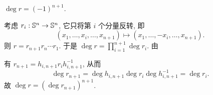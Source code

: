 \begin{Proposition}
	$ \deg r=(-1)^{n+1} $.
\end{Proposition}
\begin{Proof}
	考虑 $ r_i : \S^n\to\S^n $, 它只将第 $ i $ 个分量反转, 即
	\[
		(x_1,\dots,x_i,\dots,x_{n+1})\mapsto (x_1,\dots,-x_i,\dots,x_{n+1}).
	\]
	则 $ r=r_{n+1}r_n\cdots r_1 $. 于是 $ \deg r=\prod_{i=1}^{n+1}\deg r_i $. 由
	\begin{center}
	\end{center}
	有 $ r_{n+1}=h_{i,n+1}r_ih_{i,n+1}^{-1} $, 从而
	\[
		\deg r_{n+1}=\deg h_{i,n+1}\deg r_i\deg h_{i,n+1}^{-1}=\deg r_i.
	\]
	故 $ \deg r=(\deg r_{n+1})^{n+1} $.


\end{Proof}
